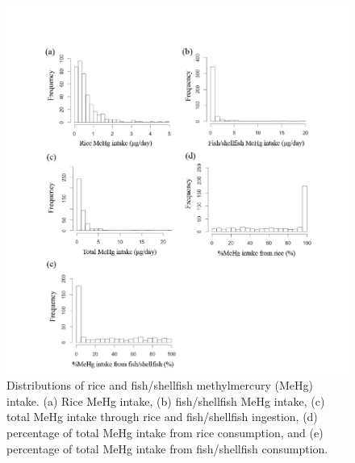 \begin{figure}
  \centering
    \label{fig:Fig27}
  \includegraphics[scale=1]{Figures/Fig27.pdf}
  \caption[Distributions of rice and fish/shellfish methylmercury intake]{Distributions of rice and fish/shellfish methylmercury (MeHg) intake. (a) Rice MeHg intake, (b) fish/shellfish MeHg intake, (c) total MeHg intake through rice and fish/shellfish ingestion, (d) percentage of total MeHg intake from rice consumption, and (e) percentage of total MeHg intake from fish/shellfish consumption.}
\end{figure}

